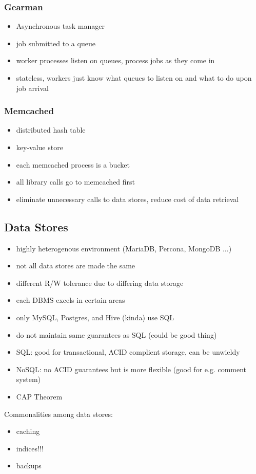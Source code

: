 \documentclass[12pt]{article}
\begin{document}
\subsubsection{Gearman}
\begin{itemize}
  \item Asynchronous task manager
  \item job submitted to a queue
  \item worker processes listen on queues, process jobs as they come in
  \item stateless, workers just know what queues to listen on and what to do
    upon job arrival
\end{itemize}
\subsubsection{Memcached}
\begin{itemize}
  \item distributed hash table
  \item key-value store
  \item each memcached process is a bucket
  \item all library calls go to memcached first
  \item eliminate unnecessary calls to data stores, reduce cost of data
    retrieval
\end{itemize}
\subsection{Data Stores}
\begin{itemize}
  \item highly heterogenous environment (MariaDB, Percona, MongoDB ...)
  \item not all data stores are made the same
  \item different R/W tolerance due to differing data storage
  \item each DBMS excels in certain areas
\end{itemize}
\begin{itemize}
  \item only MySQL, Postgres, and Hive (kinda) use SQL
  \item do not maintain same guarantees as SQL (could be good thing)
  \item SQL: good for transactional, ACID complient storage, can be unwieldy
  \item NoSQL: no ACID guarantees but is more flexible (good for e.g. comment
    system)
  \item CAP Theorem
\end{itemize}
Commonalities among data stores:\\
\begin{itemize}
  \item caching
  \item indices!!!
  \item backups
\end{itemize}
\end{document}
